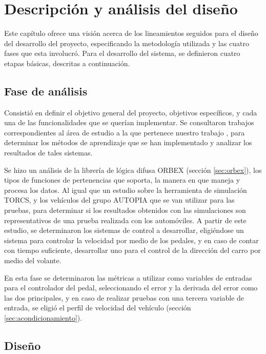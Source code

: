 \chapter{Descripción y análisis del diseño}
\label{chap:3_Descripcion}

Este capítulo ofrece una visión acerca de los lineamientos seguidos para el diseño del desarrollo del proyecto, especificando la metodología utilizada y las cuatro fases que esta involucró. Para el desarrollo del sistema, se definieron cuatro etapas básicas, descritas a continuación.


\section{Fase de análisis}
\label{subsec:analisis}


Consistió en definir el objetivo general del proyecto, objetivos específicos, y cada una de las funcionalidades que se querían implementar. Se consultaron trabajos correspondientes al área de estudio a la que pertenece nuestro trabajo \cite{servo} \cite{online} \cite{two} \cite{adaptive} , para determinar los métodos de aprendizaje que se han implementado y analizar los resultados de tales sistemas.

Se hizo un análisis de la librería de lógica difusa \gls{ORBEX} (sección \ref{sec:orbex}), los tipos de funciones de pertenencias que soporta, la manera en que maneja y procesa los datos. Al igual que un estudio sobre la herramienta de simulación \gls{TORCS}, y los vehículos del grupo AUTOPIA que se van utilizar para las pruebas, para determinar si los resultados obtenidos con las simulaciones son representativos de una prueba realizada con los automóviles. A partir de este estudio, se determinaron los sistemas de control a desarrollar, eligiéndose un sistema para controlar la velocidad por medio de los pedales, y en caso de contar con tiempo suficiente, desarrollar uno para el control de la dirección del carro por medio del volante. 

En esta fase se determinaron las métricas a utilizar como variables de entradas para el controlador del pedal, seleccionando el error y la derivada del error como las dos principales, y en caso de realizar pruebas con una tercera variable de entrada, se eligió el perfil de velocidad del vehículo (sección \ref{sec:acondicionamiento}). 

\section{Dise\~no}
\label{subsec:diseno}


